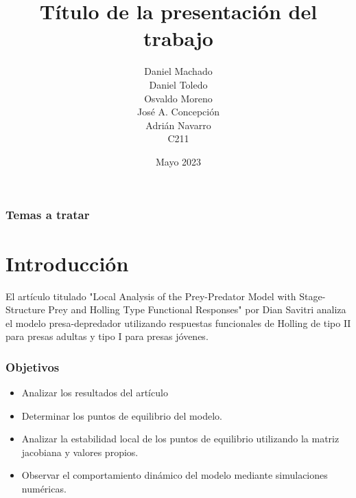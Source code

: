 \documentclass{beamer}
\title[T\'itulo del trabajo]{T\'itulo de la presentaci\'on del trabajo}
\author[Machado, Toledo, Moreno, Concepci\'on, Navarro]
		{
			Daniel Machado \\
			Daniel Toledo \\
			Osvaldo Moreno \\
			Jos\'e A. Concepci\'on \\
			Adri\'an Navarro \\
			{\small C211}
		}
\date{Mayo 2023}
\begin{document}

\begin{frame}
	\frametitle{Temas a tratar}
	\tableofcontents
\end{frame}

\section{Introducci\'on}
\begin{frame}
	\begin{minipage}{10cm}
		El artículo titulado "Local Analysis of the Prey-Predator Model with Stage-Structure Prey and Holling
		Type Functional Responses" por Dian Savitri analiza el modelo presa-depredador utilizando respuestas funcionales de Holling de tipo II para presas adultas y tipo I para presas j\'ovenes.
	\end{minipage}
\end{frame}

\begin{frame}
	\frametitle{Objetivos}
	\begin{minipage}{10cm}
		\begin{itemize}
			\item Analizar los resultados del art\'iculo
			\item Determinar los puntos de equilibrio del modelo.
			\item Analizar la estabilidad local de los puntos de equilibrio utilizando la matriz jacobiana y valores propios.
			\item Observar el comportamiento dinámico del modelo mediante
			      simulaciones numéricas.
		\end{itemize}
	\end{minipage}
\end{frame}
\end{document}
